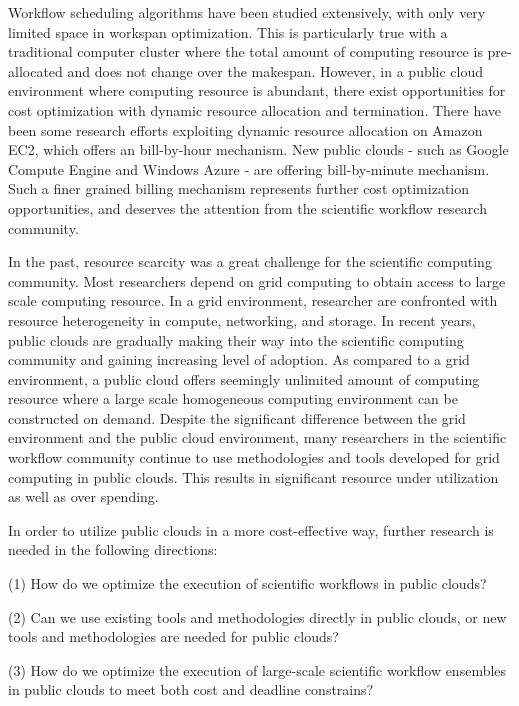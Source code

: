 Workflow scheduling algorithms have been studied extensively, with only very limited space in workspan optimization.  This is particularly true with a traditional computer cluster where the total amount of computing resource is pre-allocated and does not change over the makespan. However, in a public cloud environment where computing resource is abundant, there exist opportunities for cost optimization with dynamic resource allocation and termination. There have been some research efforts exploiting dynamic resource allocation on Amazon EC2, which offers an bill-by-hour mechanism. New public clouds - such as Google Compute Engine and Windows Azure - are offering bill-by-minute mechanism. Such a finer grained billing mechanism represents further cost optimization opportunities, and deserves the attention from the scientific workflow research community.

In the past, resource scarcity was a great challenge for the scientific computing community. Most researchers depend on grid computing to obtain access to large scale computing resource. In a grid environment, researcher are confronted with resource heterogeneity in compute, networking, and storage. In recent years, public clouds are gradually making their way into the scientific computing community and gaining increasing level of adoption. As compared to a grid environment, a public cloud offers seemingly unlimited amount of computing resource where a large scale homogeneous computing environment can be constructed on demand. Despite the significant difference between the grid environment and the public cloud environment, many researchers in the scientific workflow community continue to use methodologies and tools developed for grid computing in public clouds. This results in significant resource under utilization as well as over spending. 

In order to utilize public clouds in a more cost-effective way, further research is needed in the following directions:

(1) How do we optimize the execution of scientific workflows in public clouds?

(2) Can we use existing tools and methodologies directly in public clouds, or new tools and methodologies are needed for public clouds?

(3) How do we optimize the execution of large-scale scientific workflow ensembles in public clouds to meet both cost and deadline constrains?



